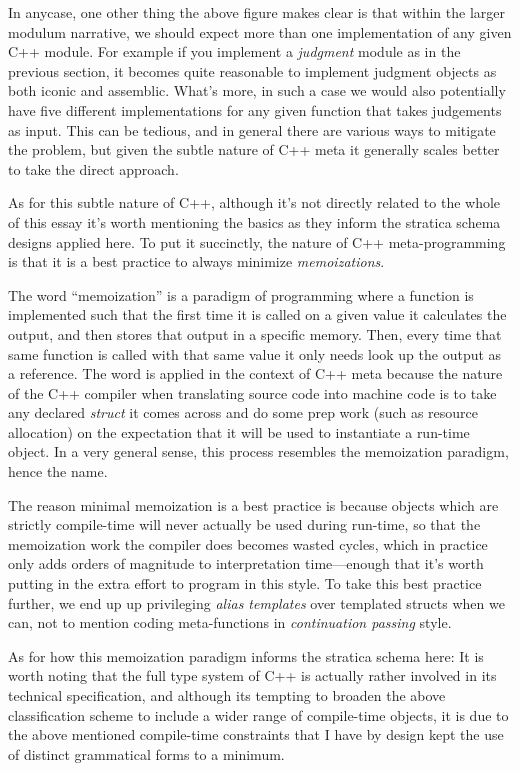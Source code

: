 \documentclass[twoside]{article}
\begin{document}
In anycase, one other thing the above figure makes clear is that within the larger modulum narrative, we should expect more
than one implementation of any given C++ module. For example if you implement a \emph{judgment} module as in the previous
section, it becomes quite reasonable to implement judgment objects as both iconic and assemblic. What's more, in such a case
we would also potentially have five different implementations for any given function that takes judgements as input. This
can be tedious, and in general there are various ways to mitigate the problem, but given the subtle nature of C++ meta
it generally scales better to take the direct approach.

As for this subtle nature of C++, although it's not directly related to the whole of this essay it's worth mentioning the
basics as they inform the stratica schema designs applied here. To put it succinctly, the nature of C++ meta-programming
is that it is a best practice to always minimize \emph{memoizations}.

The word ``memoization'' is a paradigm of programming where a function is implemented such that the first time it is called
on a given value it calculates the output, and then stores that output in a specific memory. Then, every time that same
function is called with that same value it only needs look up the output as a reference. The word is applied in the context
of C++ meta because the nature of the C++ compiler when translating source code into machine code is to take any declared
\emph{struct} it comes across and do some prep work (such as resource allocation) on the expectation that it will be used
to instantiate a run-time object. In a very general sense, this process resembles the memoization paradigm, hence the name.

The reason minimal memoization is a best practice is because objects which are strictly compile-time will never actually
be used during run-time, so that the memoization work the compiler does becomes wasted cycles, which in practice only adds
orders of magnitude to interpretation time---enough that it's worth putting in the extra effort to program in this style.
To take this best practice further, we end up up privileging \emph{alias templates} over templated structs when we can,
not to mention coding meta-functions in \emph{continuation passing} style.

As for how this memoization paradigm informs the stratica schema here: It is worth noting that the full type system of C++
is actually rather involved in its technical specification, and although its tempting to broaden the above classification
scheme to include a wider range of compile-time objects, it is due to the above mentioned compile-time constraints
that I have by design kept the use of distinct grammatical forms to a minimum.
\end{document}
